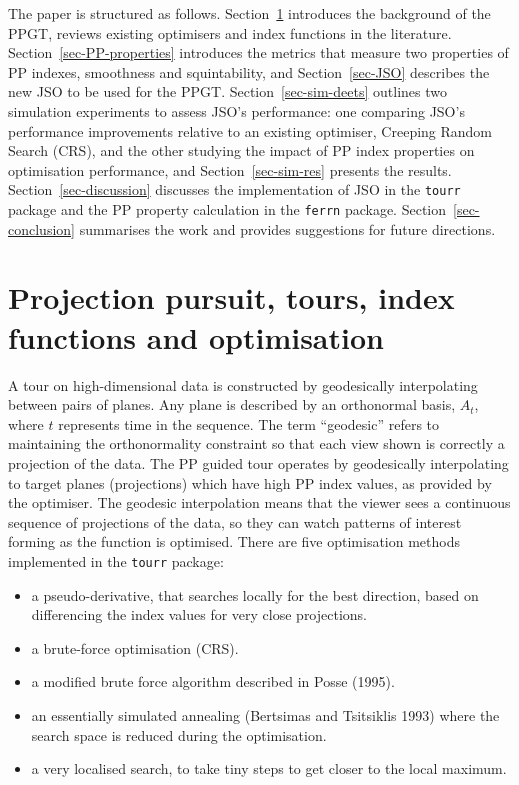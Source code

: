 \documentclass[
  12pt,
]{interact}
\providecommand{\tightlist}{%
  \setlength{\itemsep}{0pt}\setlength{\parskip}{0pt}}\usepackage{longtable,booktabs,array}
\theoremstyle{plain}
\begin{document}
The paper is structured as follows. Section~\ref{sec-background}
introduces the background of the PPGT, reviews existing optimisers and
index functions in the literature. Section~\ref{sec-PP-properties}
introduces the metrics that measure two properties of PP indexes,
smoothness and squintability, and Section~\ref{sec-JSO} describes the
new JSO to be used for the PPGT. Section~\ref{sec-sim-deets} outlines
two simulation experiments to assess JSO's performance: one comparing
JSO's performance improvements relative to an existing optimiser,
Creeping Random Search (CRS), and the other studying the impact of PP
index properties on optimisation performance, and
Section~\ref{sec-sim-res} presents the results.
Section~\ref{sec-discussion} discusses the implementation of JSO in the
\texttt{tourr} package and the PP property calculation in the
\texttt{ferrn} package. Section~\ref{sec-conclusion} summarises the work
and provides suggestions for future directions.

\section{Projection pursuit, tours, index functions and
optimisation}\label{sec-background}

A tour on high-dimensional data is constructed by geodesically
interpolating between pairs of planes. Any plane is described by an
orthonormal basis, \(A_t\), where \(t\) represents time in the sequence.
The term ``geodesic'' refers to maintaining the orthonormality
constraint so that each view shown is correctly a projection of the
data. The PP guided tour operates by geodesically interpolating to
target planes (projections) which have high PP index values, as provided
by the optimiser. The geodesic interpolation means that the viewer sees
a continuous sequence of projections of the data, so they can watch
patterns of interest forming as the function is optimised. There are
five optimisation methods implemented in the \texttt{tourr} package:

\begin{itemize}
\tightlist
\item
  a pseudo-derivative, that searches locally for the best direction,
  based on differencing the index values for very close projections.
\item
  a brute-force optimisation (CRS).
\item
  a modified brute force algorithm described in Posse (1995).
\item
  an essentially simulated annealing (Bertsimas and Tsitsiklis 1993)
  where the search space is reduced during the optimisation.
\item
  a very localised search, to take tiny steps to get closer to the local
  maximum.
\end{itemize}
\end{document}
